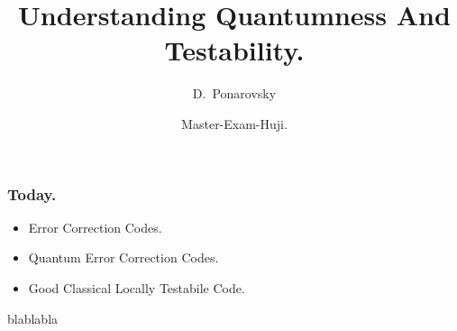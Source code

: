 \documentclass[usenames, aspectratio=169]{beamer}
\title[Understanding Quantumness And Testability.] %
{Understanding Quantumness And Testability.}
\subtitle{  }
\author[D.~Ponarovsky] %
	{D.~Ponarovsky\inst{1}}
\institute[HUJI] %
{  Faculty of Computer Science\newline
  Hebrew University of Jerusalem
}
\date[2023] %
{Master-Exam-Huji.}
\newcommand{\pslsq}[4]{
\begin{frame}
    \frametitle{#1} 
    \texttt{[image: ../source/\#3]}
    #4  
  \end{frame}
}
\begin{document}

\begin{frame}
  \maketitle
\end{frame}

\begin{frame}
  \frametitle{ Today. }
  \begin{itemize}
    \item<1-> Error Correction Codes. 
    \item<2->Quantum Error Correction Codes.
    \item<3->Good Classical Locally Testabile Code.
  \end{itemize} 
\end{frame}

\begin{frame}
%   
% 
%
%

%

blablabla

\end{frame} 
\end{document}
